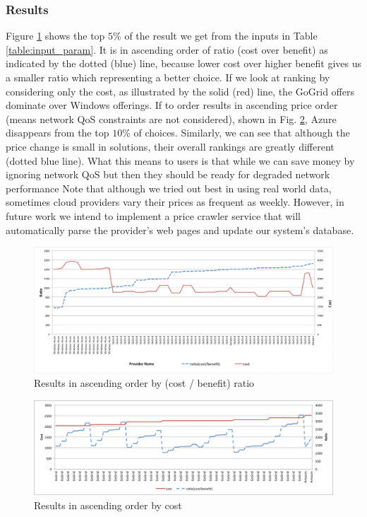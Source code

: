 \subsubsection{Results}
Figure \ref{fig7} shows the top $5\%$ of the result we get from the inputs in Table \ref{table:input_param}. It is in ascending order of ratio (cost over benefit) as indicated by the dotted (blue) line, because lower cost over higher benefit gives us a smaller ratio which representing a better choice.  If we look at ranking by considering only the cost, as illustrated by the solid (red) line, the GoGrid offers dominate over Windows offerings. If to order results in ascending price order (means network QoS constraints are not considered), shown in Fig. \ref{fig8}, Azure disappears from the top $10\%$ of choices. Similarly, we can see that although the price change is small in solutions, their overall rankings are greatly different (dotted blue line). What this means to users is that while we can save money by ignoring network QoS but then they should be ready for degraded network performance Note that although we tried out best in using real world data, sometimes cloud providers vary their prices as frequent as weekly. However, in future work we intend to implement a price crawler service that will automatically parse the provider's web pages and update our system's database.

\begin{figure}[!htp]
 \centering
 \includegraphics[width=\textwidth,keepaspectratio]{Figures/AHP/figure7.pdf}
 \caption{Results in ascending order by (cost / benefit) ratio}
\label{fig7}
\end{figure}

\begin{figure}[!htp]
 \centering
 \includegraphics[width=\textwidth,keepaspectratio]{Figures/AHP/figure8.pdf}
 \caption{Results in ascending order by cost}
\label{fig8}
\end{figure}

